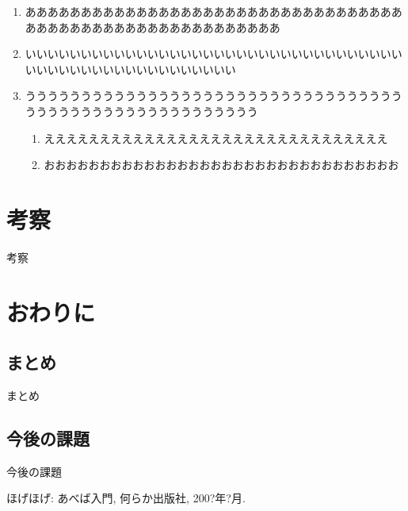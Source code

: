 \documentclass[a4paper, 12pt]{ltjreport}
\begin{document}
\begin{enumerate}
 \item あああああああああああああああああああああああああああああああああああああああああああああああああああああああああ
 \item いいいいいいいいいいいいいいいいいいいいいいいいいいいいいいいいいいいいいいいいいいいいいいいいいいいいい
 \item ううううううううううううううううううううううううううううううううううううううううううううううううううううううう
       \begin{enumerate}
	\item えええええええええええええええええええええええええええええええ
	\item おおおおおおおおおおおおおおおおおおおおおおおおおおおおおおおお
       \end{enumerate}
\end{enumerate}


\chapter{考察}
考察

\chapter{おわりに}
 \section{まとめ}
 まとめ

 \section{今後の課題}
 今後の課題


\begin{thepubbibliography}{99}

 ほげほげ: あべば入門, 何らか出版社, 200?年?月.

\end{thepubbibliography}


%
\end{document}

